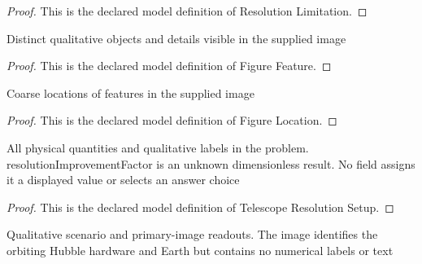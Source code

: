 \begin{proof}
  This is the declared model definition of Resolution Limitation.
\end{proof}
\begin{definition}
  \label{def:physics:phyx-mini-0131:phyxminiproblems-problemphyxmini0131-figurefeature}
  Distinct qualitative objects and details visible in the supplied image
\end{definition}
\begin{proof}
  This is the declared model definition of Figure Feature.
\end{proof}
\begin{definition}
  \label{def:physics:phyx-mini-0131:phyxminiproblems-problemphyxmini0131-figurelocation}
  Coarse locations of features in the supplied image
\end{definition}
\begin{proof}
  This is the declared model definition of Figure Location.
\end{proof}
\begin{definition}
  \label{def:physics:phyx-mini-0131:phyxminiproblems-problemphyxmini0131-telescoperesolutionsetup}
  All physical quantities and qualitative labels in the problem. resolutionImprovementFactor is an unknown dimensionless result. No field assigns it a displayed value or selects an answer choice
\end{definition}
\begin{proof}
  This is the declared model definition of Telescope Resolution Setup.
\end{proof}
\begin{definition}
  \label{def:physics:phyx-mini-0131:phyxminiproblems-problemphyxmini0131-matchesscenarioandfigure}
  Qualitative scenario and primary-image readouts. The image identifies the orbiting Hubble hardware and Earth but contains no numerical labels or text
\end{definition}
